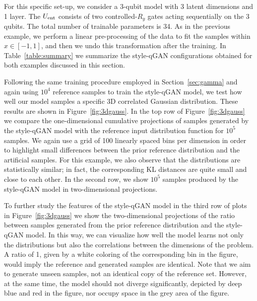 \documentclass[twocolumn,preprintnumbers,superscriptaddress]{revtex4-2}
\begin{document}
For this specific set-up, we consider a 3-qubit model with 3 latent dimensions and
1 layer. The $U_{\rm ent}$ consists of two controlled-$R_{y}$ gates acting sequentially on the 3 qubits. The total number of trainable parameters is 34. As in the previous example, we perform a linear pre-processing of the data to fit the samples within $x \in [-1, 1]$, and then we undo this transformation after the training. In Table~\ref{table:summary}
we summarize the style-qGAN configurations obtained for both examples discussed in
this section.

Following the same training procedure employed in Section~\ref{sec:gamma} and again using $10^4$ reference samples to train the style-qGAN model, we test how well our model samples a specific 3D correlated Gaussian distribution. These results are shown in Figure~\ref{fig:3dgauss}. In the top row of Figure~\ref{fig:3dgauss} we compare the one-dimensional cumulative projections of samples generated by the style-qGAN model with the reference input distribution function for $10^5$ samples. We again use a grid of 100 linearly spaced bins per dimension in order to highlight small differences between the prior reference distribution and the artificial samples.  For this example, we also observe that the distributions are statistically similar; in fact, the corresponding KL distances are quite small and close to each other. In the second row, we show $10^5$ samples produced by the style-qGAN model in two-dimensional projections. 


To further study the features of the style-qGAN model in the third row of plots in Figure~\ref{fig:3dgauss} we show the two-dimensional projections of the ratio between samples generated from the prior reference distribution and the style-qGAN model.
In this way, we can visualize how well the model learns not only the distributions but also the correlations between the dimensions of the problem. A ratio of 1, given by a white coloring of the corresponding bin in the figure, would imply the reference and generated samples are identical. Note that we aim to generate unseen samples, not an identical copy of the reference set. However, at the same time, the model should not diverge significantly, depicted by deep blue and red in the figure, nor occupy space in the grey area of the figure. 
\end{document}

